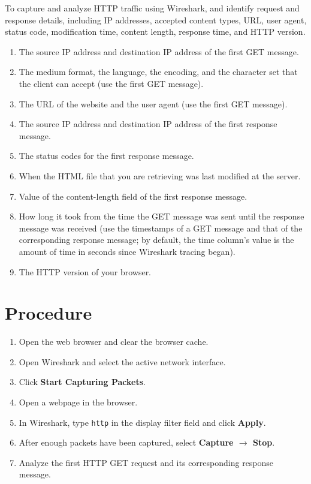 \documentclass[12pt, a4paper]{report}
\begin{document}
To capture and analyze HTTP traffic using Wireshark, and identify request and response details, including IP addresses, accepted content types, URL, user agent, status code, modification time, content length, response time, and HTTP version.
\begin{enumerate}
	\itemsep 0em
	\item[(a)] The source IP address and destination IP address of the first GET message.
	\item[(b)] The medium format, the language, the encoding, and the character set that the client can accept (use the first GET message).
	\item[(c)] The URL of the website and the user agent (use the first GET message).
	\item[(d)] The source IP address and destination IP address of the first response message.
	\item[(e)] The status codes for the first response message.
	\item[(f)] When the HTML file that you are retrieving was last modified at the server.
	\item[(g)] Value of the content-length field of the first response message.
	\item[(h)] How long it took from the time the GET message was sent until the response message was received (use the timestamps of a GET message and that of the corresponding response message; by default, the time column's value is the amount of time in seconds since Wireshark tracing began).
	\item[(i)] The HTTP version of your browser.
\end{enumerate}

\section*{Procedure}
\begin{enumerate}
	\itemsep 0em 
	\item Open the web browser and clear the browser cache.
	\item Open Wireshark and select the active network interface.
	\item Click \textbf{Start Capturing Packets}.
	\item Open a webpage in the browser.
	\item In Wireshark, type \texttt{http} in the display filter field and click \textbf{Apply}.
	\item After enough packets have been captured, select \textbf{Capture $\rightarrow$ Stop}.
	\item Analyze the first HTTP GET request and its corresponding response message.
\end{enumerate}
\end{document}
